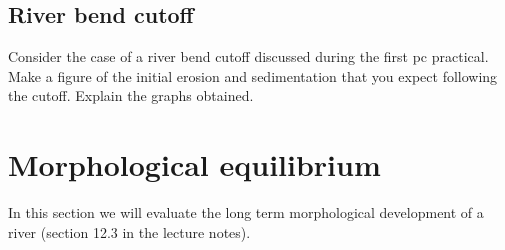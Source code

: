 \documentclass[a4paper]{article}
\begin{document}
\subsection{River bend cutoff}
\begin{exercise}
  Consider the case of a river bend cutoff discussed during the first pc practical. Make a figure of the initial erosion and sedimentation that you expect following the cutoff. Explain the graphs obtained.
\end{exercise}

\section{Morphological equilibrium}
In this section we will evaluate the long term morphological development of a river (section 12.3 in the lecture notes).
\end{document}

